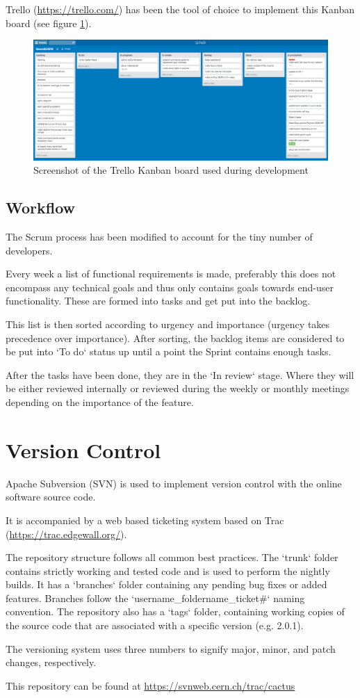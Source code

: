 Trello (\url{https://trello.com/}) has been the tool of choice to implement this
Kanban board (see figure \ref{fig:Kanban}).

\begin{figure}
  \centering
  \includegraphics[width=\textwidth]{images/Kanban}
  \caption{Screenshot of the Trello Kanban board used during development}
  \label{fig:Kanban}
\end{figure}

\subsection{Workflow}
The Scrum process has been modified to account for the tiny number of developers.

Every week a list of functional requirements is made, preferably this does not
encompass any technical goals and thus only contains goals towards end-user
functionality. These are formed into tasks and get put into the backlog.

This list is then sorted according to urgency and importance (urgency takes
precedence over importance).
After sorting, the backlog items are considered to be put into `To do` status up
until a point the Sprint contains enough tasks.

After the tasks have been done, they are in the `In review` stage. Where they will
be either reviewed internally or reviewed during the weekly or monthly meetings
depending on the importance of the feature.

\section{Version Control}
Apache Subversion (SVN) is used to implement version control with the online
software source code.

It is accompanied by a web based ticketing system based on Trac (\url{https://trac.edgewall.org/}).

The repository structure follows all common best practices. The `trunk` folder
contains strictly working and tested code and is used to perform the nightly builds.
It has a `branches` folder containing any pending bug fixes or added features.
Branches follow the `username\_foldername\_ticket\#` naming convention.
The repository also has a `tags` folder, containing working copies of the source
code that are associated with a specific version (e.g. 2.0.1).

The versioning system uses three numbers to signify major, minor, and patch changes,
respectively.

This repository can be found at \url{https://svnweb.cern.ch/trac/cactus}
